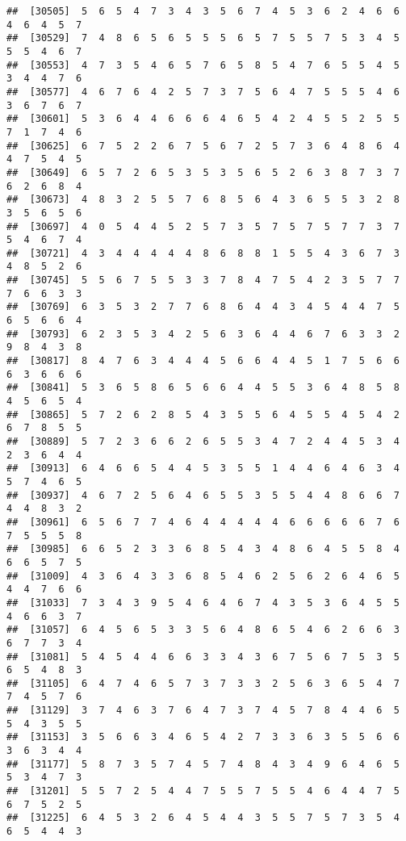 \documentclass[
]{book}
\begin{document}
\begin{verbatim}
##  [30505]  5  6  5  4  7  3  4  3  5  6  7  4  5  3  6  2  4  6  6  4  6  4  5  7
##  [30529]  7  4  8  6  5  6  5  5  5  6  5  7  5  5  7  5  3  4  5  5  5  4  6  7
##  [30553]  4  7  3  5  4  6  5  7  6  5  8  5  4  7  6  5  5  4  5  3  4  4  7  6
##  [30577]  4  6  7  6  4  2  5  7  3  7  5  6  4  7  5  5  5  4  6  3  6  7  6  7
##  [30601]  5  3  6  4  4  6  6  6  4  6  5  4  2  4  5  5  2  5  5  7  1  7  4  6
##  [30625]  6  7  5  2  2  6  7  5  6  7  2  5  7  3  6  4  8  6  4  4  7  5  4  5
##  [30649]  6  5  7  2  6  5  3  5  3  5  6  5  2  6  3  8  7  3  7  6  2  6  8  4
##  [30673]  4  8  3  2  5  5  7  6  8  5  6  4  3  6  5  5  3  2  8  3  5  6  5  6
##  [30697]  4  0  5  4  4  5  2  5  7  3  5  7  5  7  5  7  7  3  7  5  4  6  7  4
##  [30721]  4  3  4  4  4  4  4  8  6  8  8  1  5  5  4  3  6  7  3  4  8  5  2  6
##  [30745]  5  5  6  7  5  5  3  3  7  8  4  7  5  4  2  3  5  7  7  7  6  6  3  3
##  [30769]  6  3  5  3  2  7  7  6  8  6  4  4  3  4  5  4  4  7  5  6  5  6  6  4
##  [30793]  6  2  3  5  3  4  2  5  6  3  6  4  4  6  7  6  3  3  2  9  8  4  3  8
##  [30817]  8  4  7  6  3  4  4  4  5  6  6  4  4  5  1  7  5  6  6  6  3  6  6  6
##  [30841]  5  3  6  5  8  6  5  6  6  4  4  5  5  3  6  4  8  5  8  4  5  6  5  4
##  [30865]  5  7  2  6  2  8  5  4  3  5  5  6  4  5  5  4  5  4  2  6  7  8  5  5
##  [30889]  5  7  2  3  6  6  2  6  5  5  3  4  7  2  4  4  5  3  4  2  3  6  4  4
##  [30913]  6  4  6  6  5  4  4  5  3  5  5  1  4  4  6  4  6  3  4  5  7  4  6  5
##  [30937]  4  6  7  2  5  6  4  6  5  5  3  5  5  4  4  8  6  6  7  4  4  8  3  2
##  [30961]  6  5  6  7  7  4  6  4  4  4  4  4  6  6  6  6  6  7  6  7  5  5  5  8
##  [30985]  6  6  5  2  3  3  6  8  5  4  3  4  8  6  4  5  5  8  4  6  6  5  7  5
##  [31009]  4  3  6  4  3  3  6  8  5  4  6  2  5  6  2  6  4  6  5  4  4  7  6  6
##  [31033]  7  3  4  3  9  5  4  6  4  6  7  4  3  5  3  6  4  5  5  4  6  6  3  7
##  [31057]  6  4  5  6  5  3  3  5  6  4  8  6  5  4  6  2  6  6  3  6  7  7  3  4
##  [31081]  5  4  5  4  4  6  6  3  3  4  3  6  7  5  6  7  5  3  5  6  5  4  8  3
##  [31105]  6  4  7  4  6  5  7  3  7  3  3  2  5  6  3  6  5  4  7  7  4  5  7  6
##  [31129]  3  7  4  6  3  7  6  4  7  3  7  4  5  7  8  4  4  6  5  5  4  3  5  5
##  [31153]  3  5  6  6  3  4  6  5  4  2  7  3  3  6  3  5  5  6  6  3  6  3  4  4
##  [31177]  5  8  7  3  5  7  4  5  7  4  8  4  3  4  9  6  4  6  5  5  3  4  7  3
##  [31201]  5  5  7  2  5  4  4  7  5  5  7  5  5  4  6  4  4  7  5  6  7  5  2  5
##  [31225]  6  4  5  3  2  6  4  5  4  4  3  5  5  7  5  7  3  5  4  6  5  4  4  3

\end{verbatim}
\end{document}
